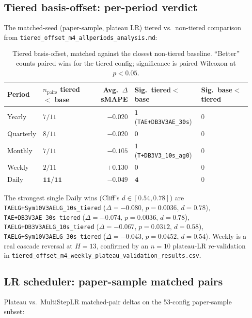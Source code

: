 \documentclass[11pt,a4paper]{article}
\begin{document}
\subsection{Tiered basis-offset: per-period verdict}
\label{app:ablations:tiered}

The matched-seed (paper-sample, plateau LR) tiered vs.\ non-tiered comparison from \texttt{tiered\_offset\_m4\_allperiods\_analysis.md}:

\begin{table}[h]
\centering
\small
\caption{Tiered basis-offset, matched against the closest non-tiered baseline. ``Better'' counts paired wins for the tiered config; significance is paired Wilcoxon at $p<0.05$.}
\label{tab:tiered_per_period}
\begin{tabular}{@{}llrll@{}}
\toprule
Period & $n_\text{pairs}$ tiered $<$ base & Avg.\ $\Delta$ sMAPE & Sig.\ tiered$<$base & Sig.\ base$<$tiered \\
\midrule
Yearly    & $7/11$  & $-0.020$ & $1$ (\texttt{TAE+DB3V3AE\_30s}) & $0$ \\
Quarterly & $8/11$  & $-0.020$ & $0$ & $0$ \\
Monthly   & $7/11$  & $-0.105$ & $1$ (\texttt{T+DB3V3\_10s\_ag0}) & $0$ \\
Weekly    & $2/11$  & $\mathbf{+0.130}$ & $0$ & $0$ \\
Daily     & $\mathbf{11/11}$ & $\mathbf{-0.049}$ & $\mathbf{4}$ & $0$ \\
\bottomrule
\end{tabular}
\end{table}

The strongest single Daily wins (Cliff's $d \in [0.54, 0.78]$) are \texttt{TAELG+Sym10V3AELG\_10s\_tiered} ($\Delta = -0.080$, $p=0.0036$, $d=0.78$), \texttt{TAE+DB3V3AE\_30s\_tiered} ($\Delta = -0.074$, $p=0.0036$, $d=0.78$), \texttt{TAELG+DB3V3AELG\_10s\_tiered} ($\Delta = -0.067$, $p=0.0312$, $d=0.58$), \texttt{TAELG+Sym10V3AELG\_30s\_tiered} ($\Delta = -0.043$, $p=0.0452$, $d=0.54$). Weekly is a real cascade reversal at $H=13$, confirmed by an $n=10$ plateau-LR re-validation in \texttt{tiered\_offset\_m4\_weekly\_plateau\_validation\_results.csv}.

\subsection{LR scheduler: paper-sample matched pairs}
\label{app:ablations:lr}

Plateau vs.\ MultiStepLR matched-pair deltas on the 53-config paper-sample subset:
\end{document}
